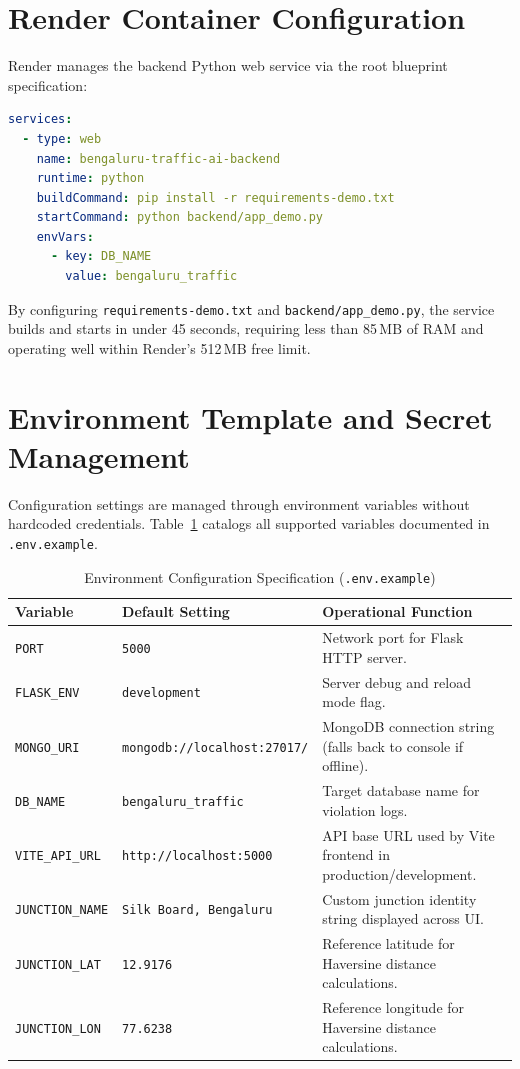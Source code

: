 \documentclass[11pt,a4paper,oneside]{report}
\begin{document}
\section{Render Container Configuration}
Render manages the backend Python web service via the root blueprint specification:
\begin{lstlisting}[language=yaml,caption={Render Service Configuration (\texttt{render.yaml})}]
services:
  - type: web
    name: bengaluru-traffic-ai-backend
    runtime: python
    buildCommand: pip install -r requirements-demo.txt
    startCommand: python backend/app_demo.py
    envVars:
      - key: DB_NAME
        value: bengaluru_traffic
\end{lstlisting}
By configuring \texttt{requirements-demo.txt} and \texttt{backend/app\_demo.py}, the service builds and starts in under 45 seconds, requiring less than 85\,MB of RAM and operating well within Render's 512\,MB free limit.

\section{Environment Template and Secret Management}
Configuration settings are managed through environment variables without hardcoded credentials. Table~\ref{tab:env_vars} catalogs all supported variables documented in \texttt{.env.example}.

\begin{table}[h!]
\centering
\small
\begin{tabularx}{\textwidth}{l p{4.2cm} X}
\toprule
\textbf{Variable} & \textbf{Default Setting} & \textbf{Operational Function} \\
\midrule
\texttt{PORT} & \texttt{5000} & Network port for Flask HTTP server. \\
\texttt{FLASK\_ENV} & \texttt{development} & Server debug and reload mode flag. \\
\texttt{MONGO\_URI} & \texttt{mongodb://localhost:27017/} & MongoDB connection string (falls back to console if offline). \\
\texttt{DB\_NAME} & \texttt{bengaluru\_traffic} & Target database name for violation logs. \\
\texttt{VITE\_API\_URL} & \texttt{http://localhost:5000} & API base URL used by Vite frontend in production/development. \\
\texttt{JUNCTION\_NAME} & \texttt{Silk Board, Bengaluru} & Custom junction identity string displayed across UI. \\
\texttt{JUNCTION\_LAT} & \texttt{12.9176} & Reference latitude for Haversine distance calculations. \\
\texttt{JUNCTION\_LON} & \texttt{77.6238} & Reference longitude for Haversine distance calculations. \\
\bottomrule
\end{tabularx}
\caption{Environment Configuration Specification (\texttt{.env.example})}
\label{tab:env_vars}
\end{table}
\end{document}
